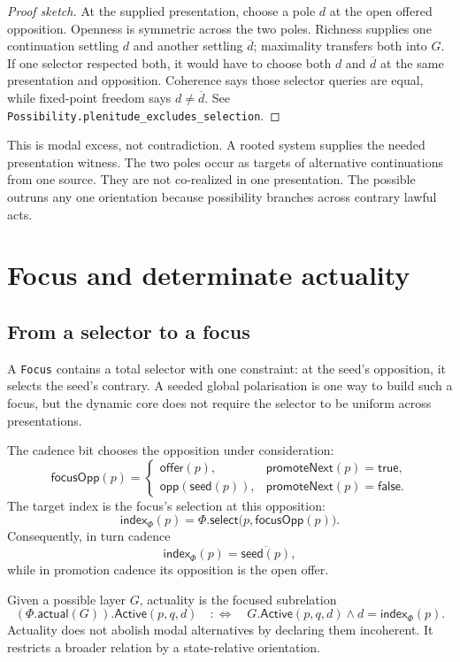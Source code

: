\documentclass[11pt]{article}
\theoremstyle{definition}
\theoremstyle{remark}
\newcommand{\lean}[1]{\nolinkurl{#1}}
\newcommand{\Seed}{\mathsf{seed}}
\newcommand{\Offer}{\mathsf{offer}}
\newcommand{\Prom}{\mathsf{promoteNext}}
\newcommand{\Index}{\mathsf{index}}
\newcommand{\Active}{\mathsf{Active}}
\newcommand{\opp}{\mathsf{opp}}
\newcommand{\negd}[1]{\overline{#1}}
\begin{document}
\begin{proof}[Proof sketch]
At the supplied presentation, choose a pole \(d\) at the open offered opposition.
Openness is symmetric across the two poles. Richness supplies one continuation
settling \(d\) and another settling \(\negd d\); maximality transfers both into
\(G\). If one selector respected both, it would have to choose both \(d\) and
\(\negd d\) at the same presentation and opposition. Coherence says those
selector queries are equal, while fixed-point freedom says
\(d\neq\negd d\). See \lean{Possibility.plenitude_excludes_selection}.
\end{proof}

This is modal excess, not contradiction. A rooted system supplies the needed
presentation witness. The two poles occur as targets of
alternative continuations from one source. They are not co-realized in one
presentation. The possible outruns any one orientation because possibility
branches across contrary lawful acts.

\section{Focus and determinate actuality}

\subsection{From a selector to a focus}

A \lean{Focus} contains a total selector with one constraint: at the seed's
opposition, it selects the seed's contrary. A seeded global polarisation is one
way to build such a focus, but the dynamic core does not require the selector
to be uniform across presentations.

The cadence bit chooses the opposition under consideration:
\[
  \mathsf{focusOpp}(p)=
  \begin{cases}
    \Offer(p), & \Prom(p)=\mathsf{true},\\
    \opp(\Seed(p)), & \Prom(p)=\mathsf{false}.
  \end{cases}
\]
The target index is the focus's selection at this opposition:
\[
  \Index_\Phi(p)=\Phi.\mathsf{select}
    \bigl(p,\mathsf{focusOpp}(p)\bigr).
\]
Consequently, in turn cadence
\[
  \Index_\Phi(p)=\negd{\Seed(p)},
\]
while in promotion cadence its opposition is the open offer.

Given a possible layer \(G\), actuality is the focused subrelation
\[
  (\Phi.\mathsf{actual}(G)).\Active(p,q,d)
  \quad:\!\!\Longleftrightarrow\quad
  G.\Active(p,q,d)\land d=\Index_\Phi(p).
\]
Actuality does not abolish modal alternatives by declaring them incoherent.
It restricts a broader relation by a state-relative orientation.
\end{document}
